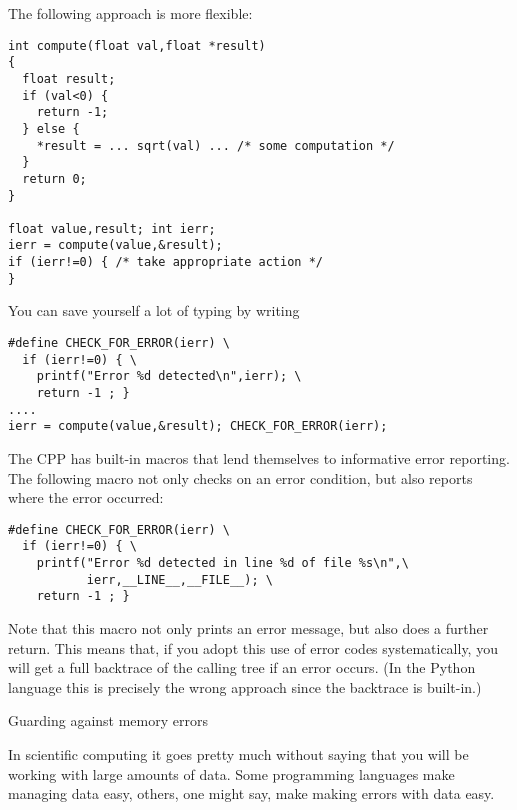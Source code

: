 The following approach is more flexible:
\begin{verbatim}
int compute(float val,float *result)
{
  float result;
  if (val<0) {
    return -1;
  } else {
    *result = ... sqrt(val) ... /* some computation */
  }
  return 0;
}

float value,result; int ierr;
ierr = compute(value,&result);
if (ierr!=0) { /* take appropriate action */
}
\end{verbatim}
You can save yourself a lot of typing by writing
\begin{verbatim}
#define CHECK_FOR_ERROR(ierr) \
  if (ierr!=0) { \
    printf("Error %d detected\n",ierr); \
    return -1 ; }
....
ierr = compute(value,&result); CHECK_FOR_ERROR(ierr);
\end{verbatim}


The \ac{CPP} has built-in macros that lend themselves
to informative error reporting.
The following macro not only checks on an error condition,
but also reports where the error occurred:
\begin{verbatim}
#define CHECK_FOR_ERROR(ierr) \
  if (ierr!=0) { \
    printf("Error %d detected in line %d of file %s\n",\
           ierr,__LINE__,__FILE__); \
    return -1 ; }
\end{verbatim}


Note that this macro not only prints an error message, but also does a
further return. This means that, if you adopt this use of error codes
systematically, you will get a full backtrace of the calling tree if
an error occurs. (In the Python language this is precisely the wrong
approach since the backtrace is built-in.)

\Level 0 {Guarding against memory errors}

In scientific computing it goes pretty much without saying that you
will be working with large amounts of data.
Some programming languages make managing data easy, others, one might
say, make making errors with data easy. 

